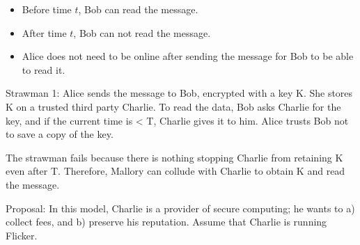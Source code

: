 \documentclass{article}
\begin{document}
\begin{itemize}

\item Before time $t$, Bob can read the message.
\item After time $t$, Bob can not read the message.
\item Alice does not need to be online after sending the message for Bob to be able to read it.

\end{itemize}

Strawman 1:
  Alice sends the message to Bob, encrypted with a key K. She stores K on a trusted third party Charlie. To read the data, Bob asks Charlie for the key, and if the current time is < T, Charlie gives it to him. Alice trusts Bob not to save a copy of the key.

  The strawman fails because there is nothing stopping Charlie from retaining K even after T. Therefore, Mallory can collude with Charlie to obtain K and read the message.

Proposal:
  In this model, Charlie is a provider of secure computing; he wants to a) collect fees, and b) preserve his reputation. Assume that Charlie is running Flicker.
\end{document}
